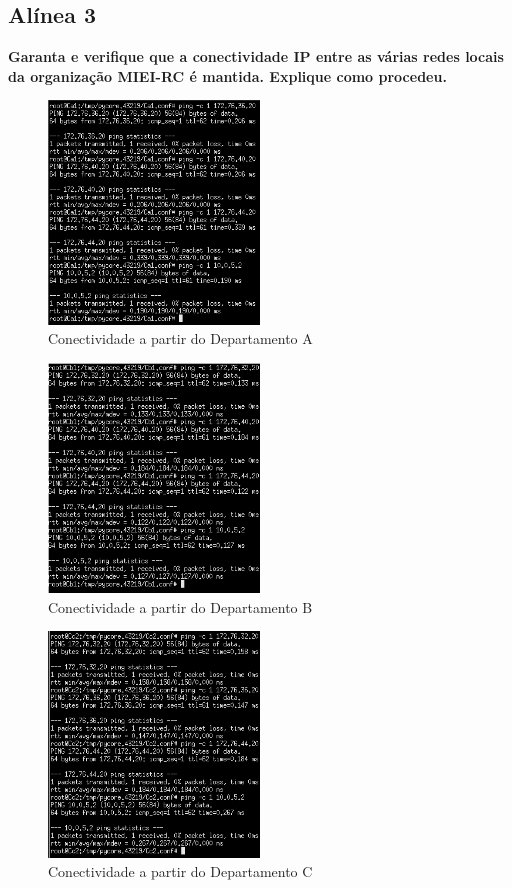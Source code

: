 \documentclass[a4paper]{report}
\begin{document}
\subsection{Alínea 3}
\textbf{Garanta e verifique que a conectividade IP entre as várias redes locais
da organização MIEI-RC é mantida. Explique como procedeu.}\\

\begin{figure}[H]
    \centering 
    \includegraphics[width=0.5\textwidth]{images/pingEx3A.png}
    \caption{Conectividade a partir do Departamento A}
    \label{fig:pingEx3A}
\end{figure}

\begin{figure}[H]
    \centering 
    \includegraphics[width=0.5\textwidth]{images/pingEx3B.png}
    \caption{Conectividade a partir do Departamento B}
    \label{fig:pingEx3B}
\end{figure}

\begin{figure}[H]
    \centering 
    \includegraphics[width=0.5\textwidth]{images/pingEx3C.png}
    \caption{Conectividade a partir do Departamento C}
    \label{fig:pingEx3C}
\end{figure}
\end{document}
